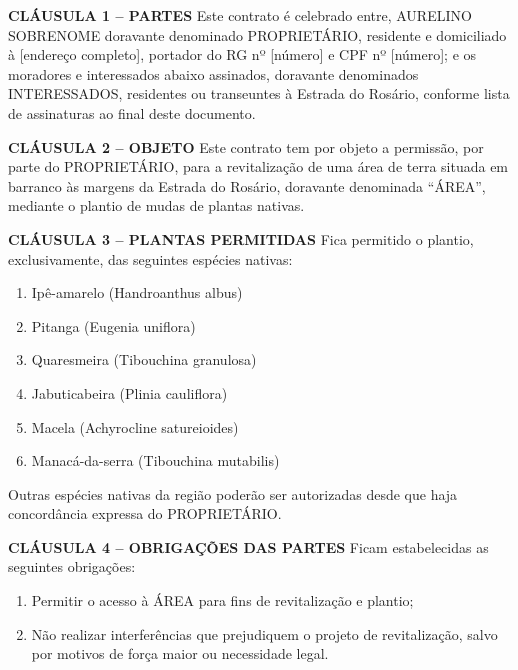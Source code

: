 \documentclass[12pt]{article}
\newcommand{\artigo}[1]{\vspace{1.0em}\noindent\textbf{#1}\hspace{0.75em}}
\newcommand{\paragrafo}[1]{\vspace{1.0em}\noindent{#1}\hspace{0.75em}}
\newcommand{\titulo}[1]{\begin{center}\fontsize{18}{22}\fontseries{b}\selectfont{#1\\[1.0em]}\end{center}}
\newcommand{\subtitulo}[1]{\begin{center}\fontsize{16}{17}\fontseries{m}\selectfont{#1\\[0.5em]}\end{center}}
\begin{document}
\titulo{CONTRATO DE REVITALIZAÇÃO DE ÁREA}
\subtitulo{Portal da Estrada Parque do Rosário}


\artigo{CLÁUSULA 1 – PARTES} Este contrato é celebrado entre, AURELINO SOBRENOME doravante denominado PROPRIETÁRIO, residente e domiciliado à [endereço completo], portador do RG nº [número] e CPF nº [número]; e os moradores e interessados abaixo assinados, doravante denominados INTERESSADOS, residentes ou transeuntes à Estrada do Rosário, conforme lista de assinaturas ao final deste documento.

\artigo{CLÁUSULA 2 – OBJETO} Este contrato tem por objeto a permissão, por parte do PROPRIETÁRIO, para a revitalização de uma área de terra situada em barranco às margens da Estrada do Rosário, doravante denominada “ÁREA”, mediante o plantio de mudas de plantas nativas.

\artigo{CLÁUSULA 3 – PLANTAS PERMITIDAS} Fica permitido o plantio, exclusivamente, das seguintes espécies nativas:

\begin{enumerate}[label=\alph*), itemsep=0pt, parsep=0pt]
  \item Ipê-amarelo (Handroanthus albus)
  \item Pitanga (Eugenia uniflora)
  \item Quaresmeira (Tibouchina granulosa)
  \item Jabuticabeira (Plinia cauliflora)
  \item Macela (Achyrocline satureioides)
  \item Manacá-da-serra (Tibouchina mutabilis)
\end{enumerate}

\paragrafo{§ ÚNICO} Outras espécies nativas da região poderão ser autorizadas desde que haja concordância expressa do PROPRIETÁRIO.

\artigo{CLÁUSULA 4 – OBRIGAÇÕES DAS PARTES} Ficam estabelecidas as seguintes obrigações:

\paragrafo{Do Proprietário:}
\begin{enumerate}[label=\alph*), itemsep=0pt, parsep=0pt]
\item Permitir o acesso à ÁREA para fins de revitalização e plantio;  
\item Não realizar interferências que prejudiquem o projeto de revitalização, salvo por motivos de força maior ou necessidade legal.
\end{enumerate}
\end{document}
